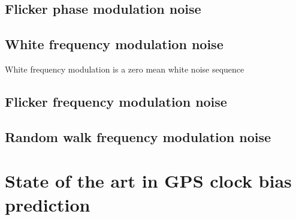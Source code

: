 \subsection{Flicker phase modulation noise}


\subsection{White frequency modulation noise}
White frequency modulation is a zero mean white noise sequence 

\subsection{Flicker frequency modulation noise}

\subsection{Random walk frequency modulation noise}




\section{State of the art in GPS clock bias prediction}

